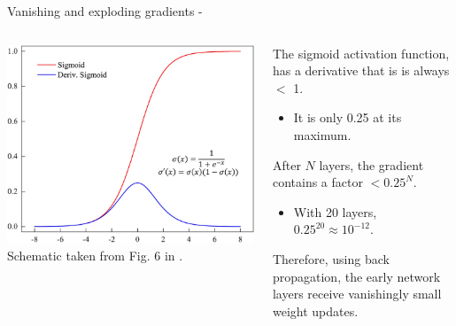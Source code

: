 \begin{frame}[t,allowframebreaks]{
    Vanishing and exploding gradients -}
    \begin{columns}
        \begin{column}{0.50\textwidth}        
            \begin{center}
                \includegraphics[width=1.00\textwidth]
                    {./images/activation_functions/xiang22_sigmoid_and_derivative.png}\\
                {\tiny 
                    \color{col:attribution} 
                    Schematic taken from Fig. 6 in \cite{Xiang:2022ato}.\\
                }
            \end{center}        
        \end{column}
        \begin{column}{0.50\textwidth}
            The \gls{sigmoid} 
            \gls{activation function},
            has a \gls{derivative} that is
            is always $<$ 1.\\
            \begin{itemize}
                \small
                \item It is only 0.25 at its maximum.\\
            \end{itemize}
            \vspace{0.2cm}
            After $N$ layers, the gradient contains
            a factor $<0.25^N$.        
            \begin{itemize}
                \small
                \item With 20 layers, $0.25^{20} \approx 10^{-12}$.
            \end{itemize}
            \vspace{0.2cm}
            Therefore, using 
            \gls{back propagation},
            the early network layers receive vanishingly small
            weight updates.
        \end{column}
    \end{columns}


\end{frame}
